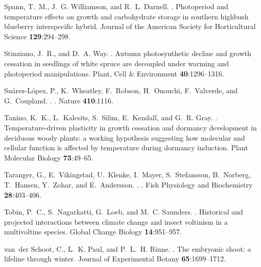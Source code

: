\documentclass{article}
\begin{document}
\begin{thebibliography}{131}
Spann, T.~M., J.~G. Williamson, and R.~L. Darnell.
.
\newblock Photoperiod and temperature effects on growth and carbohydrate
  storage in southern highbush blueberry interspecific hybrid.
\newblock Journal of the American Society for Horticultural Science {\bf
  129}:294--298.

Stinziano, J.~R., and D.~A. Way.
.
\newblock Autumn photosynthetic decline and growth cessation in seedlings of
  white spruce are decoupled under warming and photoperiod manipulations.
\newblock Plant, Cell \& Environment {\bf 40}:1296--1316.

Su{\'a}rez-L{\'o}pez, P., K.~Wheatley, F.~Robson, H.~Onouchi, F.~Valverde, and
  G.~Coupland.
.
.
\newblock Nature {\bf 410}:1116.

Tanino, K.~K., L.~Kalcsits, S.~Silim, E.~Kendall, and G.~R. Gray.
.
\newblock Temperature-driven plasticity in growth cessation and dormancy
  development in deciduous woody plants: a working hypothesis suggesting how
  molecular and cellular function is affected by temperature during dormancy
  induction.
\newblock Plant Molecular Biology {\bf 73}:49--65.

Taranger, G., E.~Vikingstad, U.~Klenke, I.~Mayer, S.~Stefansson, B.~Norberg,
  T.~Hansen, Y.~Zohar, and E.~Andersson.
.
.
\newblock Fish Physiology and Biochemistry {\bf 28}:403--406.

Tobin, P.~C., S.~Nagarkatti, G.~Loeb, and M.~C. Saunders.
.
\newblock Historical and projected interactions between climate change and
  insect voltinism in a multivoltine species.
\newblock Global Change Biology {\bf 14}:951--957.

van~der Schoot, C., L.~K. Paul, and P.~L.~H. Rinne.
.
\newblock The embryonic shoot: a lifeline through winter.
\newblock Journal of Experimental Botany {\bf 65}:1699--1712.


\end{thebibliography}
\end{document}
